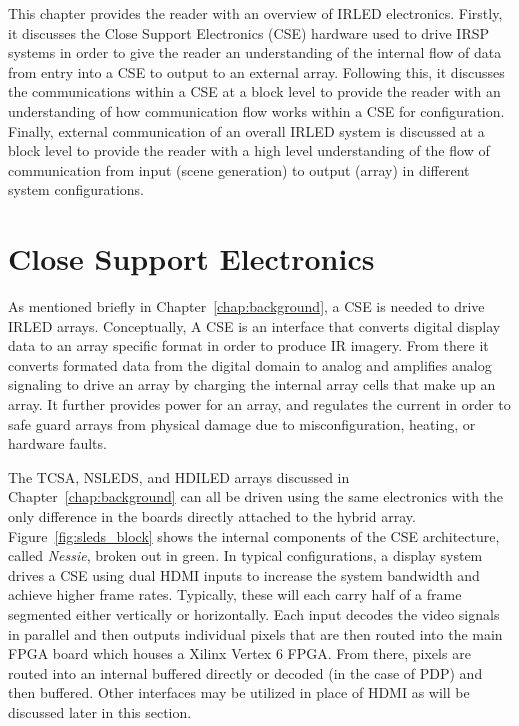 \label{chap:system_overview}
This chapter provides the reader with an overview of IRLED electronics. Firstly, it discusses the Close Support Electronics (CSE)\cite{EjzakEtAl2015,HernandezEtAl2019,SinghEtAl2020} hardware used to drive IRSP systems in order to give the reader an understanding of the internal flow of data from entry into a CSE to output to an external array. Following this, it discusses the communications within a CSE at a block level to provide the reader with an understanding of how communication flow works within a CSE for configuration. Finally, external communication of an overall IRLED system is discussed at a block level to provide the reader with a high level understanding of the flow of communication from input (scene generation) to output (array) in different system configurations.

\section{Close Support Electronics}
    \label{sec:close_support_electronics}
    As mentioned briefly in Chapter~\ref{chap:background}, a CSE is needed to drive IRLED arrays. Conceptually, A CSE is an interface that converts digital display data to an array specific format in order to produce IR imagery. From there it converts formated data from the digital domain to analog and amplifies analog signaling to drive an array by charging the internal array cells that make up an array. It further provides power for an array, and regulates the current in order to safe guard arrays from physical damage due to misconfiguration, heating, or hardware faults.

    The TCSA, NSLEDS, and HDILED arrays discussed in Chapter~\ref{chap:background} can all be driven using the same electronics with the only difference in the boards directly attached to the hybrid array. Figure~\ref{fig:sleds_block} shows the internal components of the CSE architecture, called {\it Nessie}, broken out in green. In typical configurations, a display system drives a CSE using dual HDMI inputs to increase the system bandwidth and achieve higher frame rates. Typically, these will each carry half of a frame segmented either vertically or horizontally. Each input decodes the video signals in parallel and then outputs individual pixels that are then routed into the main FPGA board which houses a Xilinx Vertex 6 FPGA\cite{XILINX2015}. From there, pixels are routed into an internal buffered directly or decoded (in the case of PDP) and then buffered. Other interfaces may be utilized in place of HDMI as will be discussed later in this section.

